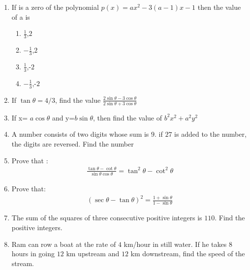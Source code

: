 \begin{enumerate}
\item If is a zero of the polynomial $p(x)=ax^2-3(a-1)x-1$  then the value of a is 
\begin{enumerate}
\item $\frac{1}{3}$,$2$
\item $-\frac{1}{3}$,$2$
\item $\frac{1}{3}$,-$2$
\item $-\frac{1}{3}$,-$2$
\end{enumerate}



\item If  $\tan \theta = 4/3$, find the value 
$\frac{2\sin \theta -3\cos \theta}{2\sin\theta+3\cos\theta}$

\item If x=  $a\cos\theta$ and y=$b\sin\theta$, then find the value of   $b^2x^2+a^2y^2$

\item A number consists of two digits whose sum is $9$. if $27$ is added to the number, the digits are reversed. Find the number
\item Prove that :
\begin{align}
\frac{\tan\theta-\cot\theta}{\sin\theta\cos\theta}=\tan^2\theta-\cot^2\theta 
\end{align}
\item Prove that:
\begin{align}
(\sec\theta-\tan\theta)^2 =\frac{1+\sin\theta}{1-\sin\theta}
\end{align}

\item The sum of the squares of three consecutive positive 
integers is $110$. Find the positive integers.

\item Ram can row a boat at the rate of $4$ km/hour in still 
water. If he takes $8$ hours in going $12$ km upstream and 
$12$ km downstream, find the speed of the stream.


\end{enumerate}
